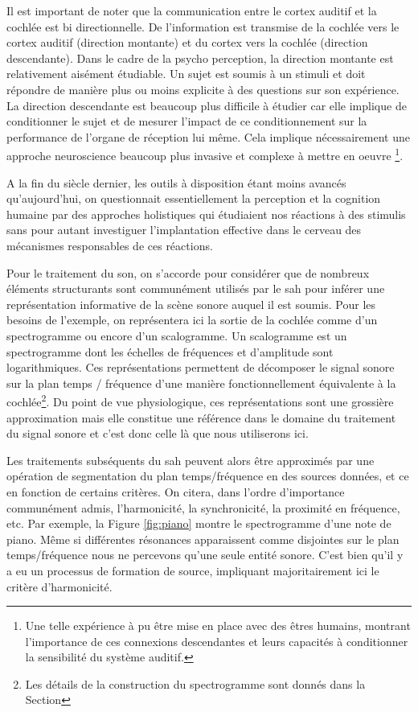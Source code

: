 Il est important de noter que la communication entre le cortex auditif et la cochlée est bi directionnelle. De l'information est transmise de la cochlée vers le cortex auditif (direction montante) et du cortex vers la cochlée (direction descendante). Dans le cadre de la psycho perception, la direction montante est relativement aisément étudiable. Un sujet est soumis à un stimuli et doit répondre de manière plus ou moins explicite à des questions sur son expérience. La direction descendante est beaucoup plus difficile à étudier car elle implique de conditionner le sujet et de mesurer l'impact de ce conditionnement sur la performance de l'organe de réception lui même. Cela implique nécessairement une approche \og neuroscience \fg beaucoup plus invasive et complexe à mettre en oeuvre \footnote{Une telle expérience à pu être mise en place avec des êtres humains, montrant l'importance de ces connexions descendantes et leurs capacités à conditionner la sensibilité du système auditif\cite{mesgarani2012selective}.}.

A la fin du siècle dernier, les outils à disposition étant moins avancés qu'aujourd'hui, on questionnait essentiellement la perception et la cognition humaine par des approches \og holistiques \fg qui étudiaient nos réactions à des stimulis sans pour autant investiguer l'implantation effective dans le cerveau des mécanismes responsables de ces réactions.

Pour le traitement du son, on s'accorde pour considérer que de nombreux éléments structurants sont communément utilisés par le sah pour inférer une représentation informative de la scène sonore auquel il est soumis. Pour les besoins de l'exemple, on représentera ici la sortie de la cochlée comme d'un spectrogramme ou encore d'un scalogramme. Un scalogramme est un spectrogramme dont les échelles de fréquences et d'amplitude sont logarithmiques. Ces représentations permettent de décomposer le signal sonore sur la plan temps / fréquence d'une manière fonctionnellement équivalente à la cochlée\footnote{Les détails de la construction du spectrogramme sont donnés dans la Section }. Du point de vue physiologique, ces représentations sont une grossière approximation\cite{lyon2017human} mais elle constitue une référence dans le domaine du traitement du signal sonore et c'est donc celle là que nous utiliserons ici.

Les traitements subséquents  du sah peuvent alors être approximés par une opération de segmentation du plan temps/fréquence en des sources données, et ce en fonction de certains critères.  On citera, dans l'ordre d'importance communément admis, l'harmonicité, la synchronicité, la proximité en fréquence, etc. Par exemple, la Figure \ref{fig:piano} montre le spectrogramme d'une note de piano. Même si différentes résonances apparaissent comme disjointes sur le plan temps/fréquence nous ne percevons qu'une seule entité sonore. C'est bien qu'il y a eu un processus de formation de source, impliquant majoritairement ici le critère d'harmonicité.

